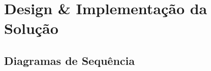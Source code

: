 \chapter{Design \& Implementação da Solução}



\section{Diagramas de Sequência}
\label{sequenceDiagrams}









